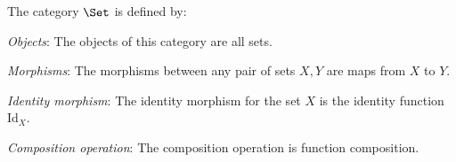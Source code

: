 \begin{shaded}
\begin{definition}
    The category $\Set$ is defined by:
    \begin{compactenum}
    \item \emph{Objects}: The objects of this category are all sets.
    \item \emph{Morphisms}: The morphisms between any pair of sets $X, Y$
    are maps from $X$ to $Y$.
    \item \emph{Identity morphism}: The identity morphism for the set $X$
    is the identity function $\text{Id}_X$.
    \item \emph{Composition operation}: The composition operation is function
    composition.
    \end{compactenum}
\end{definition}
\end{shaded}